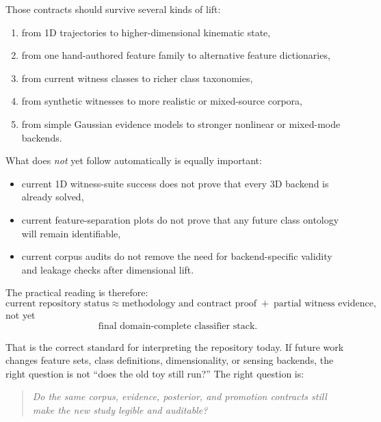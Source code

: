 \documentclass[11pt]{article}
\begin{document}
Those contracts should survive several kinds of lift:
\begin{enumerate}[leftmargin=1.5em]
  \item from 1D trajectories to higher-dimensional kinematic state,
  \item from one hand-authored feature family to alternative feature dictionaries,
  \item from current witness classes to richer class taxonomies,
  \item from synthetic witnesses to more realistic or mixed-source corpora,
  \item from simple Gaussian evidence models to stronger nonlinear or mixed-mode backends.
\end{enumerate}

What does \emph{not} yet follow automatically is equally important:
\begin{itemize}[leftmargin=1.5em]
  \item current 1D witness-suite success does not prove that every 3D backend is already solved,
  \item current feature-separation plots do not prove that any future class ontology will remain identifiable,
  \item current corpus audits do not remove the need for backend-specific validity and leakage checks after dimensional lift.
\end{itemize}

The practical reading is therefore:
\begin{equation}
\text{current repository status}
\approx
\text{methodology and contract proof}
\;+\;
\text{partial witness evidence},
\end{equation}
not yet
\begin{equation}
\text{final domain-complete classifier stack}.
\end{equation}

That is the correct standard for interpreting the repository today. If future work changes feature sets, class definitions, dimensionality, or sensing backends, the right question is not ``does the old toy still run?'' The right question is:
\begin{quote}
\textit{Do the same corpus, evidence, posterior, and promotion contracts still make the new study legible and auditable?}
\end{quote}
\end{document}
